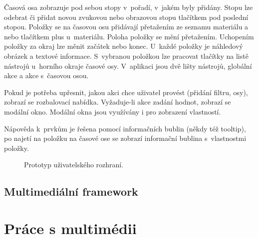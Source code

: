 Časová osa zobrazuje pod sebou stopy v~pořadí, v~jakém byly přidány. Stopu lze odebrat či přidat novou zvukovou nebo obrazovou stopu tlačítkem pod poslední stopou. Položky se na časovou osu přidávají přetažením ze seznamu materiálu a nebo tlačítkem plus u~materiálu. Poloha položky se mění přetažením. Uchopením položky za okraj lze měnit začátek nebo konec. U~každé položky je náhledový obrázek a textové informace. S~vybranou položkou lze pracovat tlačítky na listě nástrojů u~horního okraje časové osy. V~aplikaci jsou dvě lišty nástrojů, globální akce a akce s~časovou osou. 

Pokud je potřeba upřesnit, jakou akci chce uživatel provést (přidání filtru, osy), zobrazí se rozbalovací nabídka. Vyžaduje-li akce zadání hodnot, zobrazí se modální okno. Modální okna jsou využívány i pro zobrazení vlastností.

Nápověda k~prvkům je řešena pomocí informačních bublin (někdy též tooltip), po najetí na položku na časové ose se zobrazí informační bublina s~vlastnostmi položky.

\begin{figure}[h]
	\centering
	\caption{Prototyp uživatelského rozhraní.}\label{img:mockup}
\end{figure}

\section{Multimediální framework}

\chapter{Práce s multimédii}
